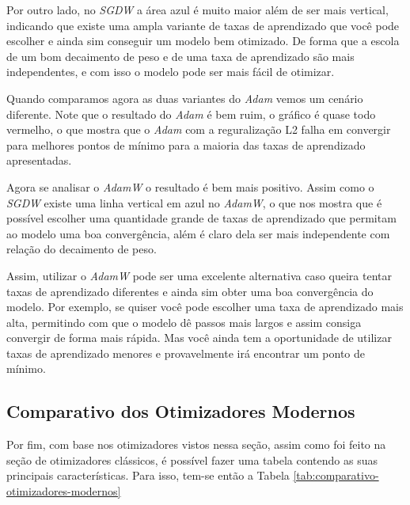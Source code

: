 Por outro lado, no \textit{SGDW} a área azul é muito maior além de ser mais vertical, indicando que existe uma ampla variante de taxas de aprendizado que você pode escolher e ainda sim conseguir um modelo bem otimizado. De forma que a escola de um bom decaimento de peso e de uma taxa de aprendizado são mais independentes, e com isso o modelo pode ser mais fácil de otimizar.

Quando comparamos agora as duas variantes do \textit{Adam} vemos um cenário diferente. Note que o resultado do \textit{Adam} é bem ruim, o gráfico é quase todo vermelho, o que mostra que o \textit{Adam} com a reguralização L2 falha em convergir para melhores pontos de mínimo para a maioria das taxas de aprendizado apresentadas.

Agora se analisar o \textit{AdamW} o resultado é bem mais positivo. Assim como o \textit{SGDW} existe uma linha vertical em azul no \textit{AdamW}, o que nos mostra que é possível escolher uma quantidade grande de taxas de aprendizado que permitam ao modelo uma boa convergência, além é claro dela ser mais independente com relação do decaimento de peso.

Assim, utilizar o \textit{AdamW} pode ser uma excelente alternativa caso queira tentar taxas de aprendizado diferentes e ainda sim obter uma boa convergência do modelo. Por exemplo, se quiser você pode escolher uma taxa de aprendizado mais alta, permitindo com que o modelo dê passos mais largos e assim consiga convergir de forma mais rápida. Mas você ainda tem a oportunidade de utilizar taxas de aprendizado menores e provavelmente irá encontrar um ponto de mínimo.

\subsection{Comparativo dos Otimizadores Modernos}

Por fim, com base nos otimizadores vistos nessa seção, assim como foi feito na seção de otimizadores clássicos, é possível fazer uma tabela contendo as suas principais características. Para isso, tem-se então a Tabela \ref{tab:comparativo-otimizadores-modernos}

